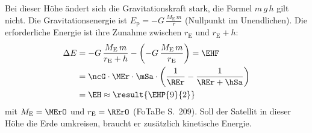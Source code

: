 \begin{center}
\end{center}

Bei dieser Höhe ändert sich die Gravitationskraft stark, die Formel $m\,g\,h$ gilt nicht. Die Gravitationsenergie ist $E_\mathrm{p} = -G\,\frac{M_\mathrm{E}\,m}{r}$ (Nullpunkt im Unendlichen). Die erforderliche Energie ist ihre Zunahme zwischen $r_\mathrm{E}$ und $r_\mathrm{E}+h$:
\begin{align}
 \Delta E &= -G\,\frac{M_\mathrm{E}\,m}{r_\mathrm{E}+h}-\left(-G\,\frac{M_\mathrm{E}\,m}{r_\mathrm{E}}\right) = \EHF \\
   &= \ncG\cdot\MEr\cdot\mSa\cdot\left(\frac{1}{\REr}-\frac{1}{\REr+\hSa}\right) \\
   &= \EH \approx \result{\EHP{9}{2}}
\end{align}
mit $M_\mathrm{E} = \MErO$ und $r_\mathrm{E} = \RErO$ (FoTaBe S.~209). Soll der Satellit in dieser Höhe die Erde umkreisen, braucht er zusätzlich kinetische Energie.
